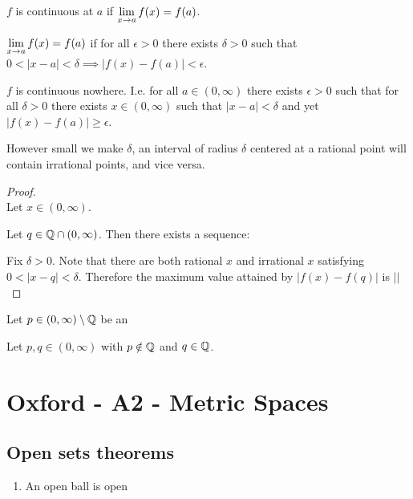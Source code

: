 \begin{definition*}[continuity]
  $f$ is continuous at $a$ if $\LimEq{f(x)}{f(a)}{x}{a}$.
\end{definition*}

\begin{definition*}[limit]
  $\LimEq{f(x)}{f(a)}{x}{a}$ if for all $\epsilon > 0$ there exists $\delta > 0$ such that
  $0 < |x - a| < \delta \implies |f(x) - f(a)| < \epsilon$.
\end{definition*}

\begin{theorem*}
  $f$ is continuous nowhere. I.e. for all $a \in (0, \infty)$ there exists $\epsilon > 0$ such that
  for all $\delta > 0$ there exists $x \in (0, \infty)$ such that $|x - a| < \delta$ and yet
  $|f(x) - f(a)| \geq \epsilon$.
\end{theorem*}

\begin{intuition*}
  However small we make $\delta$, an interval of radius $\delta$ centered at a rational point will
  contain irrational points, and vice versa.
\end{intuition*}

\begin{proof}~\\
  Let $x \in (0, \infty)$.

  Let $q \in \Q \cap (0, \infty)$. Then there exists a sequence:




  Fix $\delta > 0$. Note that there are both rational $x$ and
  irrational $x$ satisfying $0 < |x - q| < \delta$. Therefore the maximum value attained by
  $|f(x) - f(q)|$ is $||$
\end{proof}



Let $p \in (0, \infty) \setminus \Q$ be an

Let $p, q \in (0, \infty)$ with $p \notin \Q$ and $q \in \Q$.


\newpage
\section{Oxford - A2 - Metric Spaces}

\subsection{Open sets theorems}
\begin{enumerate}
\item An open ball is open
\end{enumerate}

